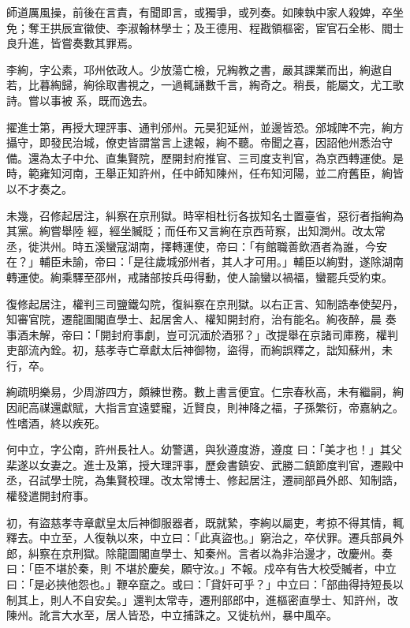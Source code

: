 \begin{pinyinscope}
 師道厲風操，前後在言責，有聞即言，或獨爭，或列奏。如陳執中家人殺婢，卒坐免；奪王拱辰宣徽使、李淑翰林學士；及王德用、程戡領樞密，宦官石全彬、閻士良升進，皆嘗奏數其罪焉。



 李絢，字公素，邛州依政人。少放蕩亡檢，兄綯教之書，嚴其課業而出，絢遨自若，比暮綯歸，絢徐取書視之，一過輒誦數千言，綯奇之。稍長，能屬文，尤工歌詩。嘗以事被
 系，既而逸去。



 擢進士第，再授大理評事、通判邠州。元昊犯延州，並邊皆恐。邠城陴不完，絢方攝守，即發民治城，僚吏皆謂當言上逮報，絢不聽。帝聞之喜，因詔他州悉治守備。還為太子中允、直集賢院，歷開封府推官、三司度支判官，為京西轉運使。是時，範雍知河南，王舉正知許州，任中師知陳州，任布知河陽，並二府舊臣，絢皆以不才奏之。



 未幾，召修起居注，糾察在京刑獄。時宰相杜衍各拔知名士置臺省，惡衍者指絢為其黨。絢嘗舉陸
 經，經坐贓貶；而任布又言絢在京西苛察，出知潤州。改太常丞，徙洪州。時五溪蠻寇湖南，擇轉運使，帝曰：「有館職善飲酒者為誰，今安在？」輔臣未諭，帝曰：「是往歲城邠州者，其人才可用。」輔臣以絢對，遂除湖南轉運使。絢乘驛至邵州，戒諸部按兵毋得動，使人諭蠻以禍福，蠻罷兵受約束。



 復修起居注，權判三司鹽鐵勾院，復糾察在京刑獄。以右正言、知制誥奉使契丹，知審官院，遷龍圖閣直學士、起居舍人、權知開封府，治有能名。絢夜醉，晨
 奏事酒未解，帝曰：「開封府事劇，豈可沉湎於酒邪？」改提舉在京諸司庫務，權判吏部流內銓。初，慈孝寺亡章獻太后神御物，盜得，而絢誤釋之，詘知蘇州，未行，卒。



 絢疏明樂易，少周游四方，頗練世務。數上書言便宜。仁宗春秋高，未有繼嗣，絢因祀高禖還獻賦，大指言宜遠嬖寵，近賢良，則神降之福，子孫繁衍，帝嘉納之。性嗜酒，終以疾死。



 何中立，字公南，許州長社人。幼警邁，與狄遵度游，遵度
 曰：「美才也！」其父棐遂以女妻之。進士及第，授大理評事，歷僉書鎮安、武勝二鎮節度判官，遷殿中丞，召試學士院，為集賢校理。改太常博士、修起居注，遷祠部員外郎、知制誥，權發遣開封府事。



 初，有盜慈孝寺章獻皇太后神御服器者，既就縶，李絢以屬吏，考掠不得其情，輒釋去。中立至，人復執以來，中立曰：「此真盜也。」窮治之，卒伏罪。遷兵部員外郎，糾察在京刑獄。除龍圖閣直學士、知秦州。言者以為非治邊才，改慶州。奏曰：「臣不堪於秦，則
 不堪於慶矣，願守汝。」不報。戍卒有告大校受贓者，中立曰：「是必挾他怨也。」鞭卒竄之。或曰：「貸奸可乎？」中立曰：「部曲得持短長以制其上，則人不自安矣。」還判太常寺，遷刑部郎中，進樞密直學士、知許州，改陳州。訛言大水至，居人皆恐，中立捕誅之。又徙杭州，暴中風卒。




\end{pinyinscope}
